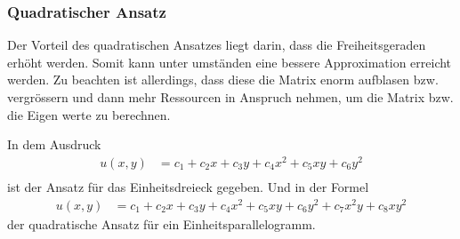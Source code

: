 \subsubsection{Quadratischer Ansatz
\label{fem:subsection:bonorum}}

Der Vorteil des quadratischen Ansatzes liegt darin, dass die Freiheitsgeraden erhöht werden. Somit kann unter umständen eine bessere Approximation erreicht werden.
Zu beachten ist allerdings, dass diese die Matrix enorm aufblasen bzw. vergrössern und dann mehr Ressourcen in Anspruch nehmen, um die Matrix bzw. die Eigen werte zu berechnen.

In dem Ausdruck
\begin{align}
	u(x,y) &= c_1 + c_2 x + c_3 y + c_4 x^2 + c_5 xy + c_6 y^2 \label{fem:equationSchwarzquadratischD} \\ 
\end{align}	
ist der Ansatz für das Einheitsdreieck gegeben. Und in der Formel
\begin{align}
u(x,y) &= c_1 + c_2 x + c_3 y + c_4 x^2 + c_5 xy + c_6 y^2 + c_7 x^2y + c_8 xy^2 \label{fem:equationSchwarzquadratischP}
\end{align}
der quadratische Ansatz für ein Einheitsparallelogramm.





